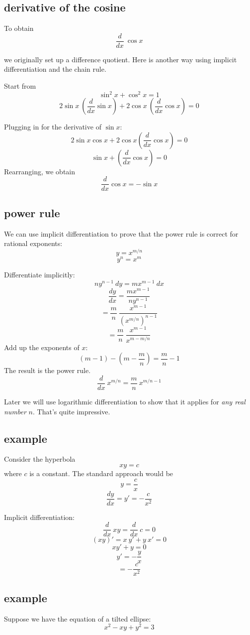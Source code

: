 \documentclass[11pt, oneside]{article}
\begin{document}
\subsection*{derivative of the cosine}

To obtain
\[ \frac{d}{dx} \ \cos x \]

we originally set up a difference quotient.  Here is another way using implicit differentiation and the chain rule.

Start from
\[ \sin^2 x + \cos^2 x = 1 \]
\[ 2 \sin x \ (\frac{d}{dx} \sin x) + 2 \cos x \ (\frac{d}{dx} \cos x) = 0 \]

Plugging in for the derivative of $\sin x$:
\[ 2 \sin x \cos x + 2 \cos x (\frac{d}{dx} \cos x) = 0 \]
\[ \sin x + (\frac{d}{dx} \cos x) = 0 \]
Rearranging, we obtain
\[ \frac{d}{dx} \cos x = - \sin x \]

\subsection*{power rule}

We can use implicit differentiation to prove that the power rule is correct for rational exponents:
\[ y = x^{m/n} \]
\[ y^n = x^m \]

Differentiate implicitly:
\[ n y^{n-1} \ dy = mx^{m-1} \ dx \]
\[ \frac{dy}{dx} = \frac{mx^{m-1} }{n y^{n-1}} \]
\[ = \frac{m}{n} \ \frac{x^{m-1}}{(x^{m/n})^{n-1}} \]
\[ = \frac{m}{n} \ \frac{x^{m-1}}{x^{m - m/n}} \]
Add up the exponents of $x$:
\[ (m - 1) - (m - \frac{m}{n} ) = \frac{m}{n} - 1\]
The result is the power rule.
\[ \frac{d}{dx} \ x^{m/n} = \frac{m}{n} \ x^{m/n - 1} \]

Later we will use logarithmic differentiation to show that it applies for \emph{any real number} $n$.  That's quite impressive.

\subsection*{example}
Consider the hyperbola
\[ xy = c \]
where $c$ is a constant.  The standard approach would be
\[ y = \frac{c}{x} \]
\[ \frac{dy}{dx} = y' = -\frac{c}{x^2} \]

Implicit differentiation:
\[ \frac{d}{dx} \ xy = \frac{d}{dx} \ c = 0 \]
\[ (xy)' = x \ y' + y \ x' = 0  \]
\[ xy' + y = 0 \]
\[ y' = -\frac{y}{x} \]
\[ = -\frac{c}{x^2} \]

\subsection*{example}
Suppose we have the equation of a tilted ellipse:
\[ x^2 - xy + y^2 = 3 \]
\end{document}
